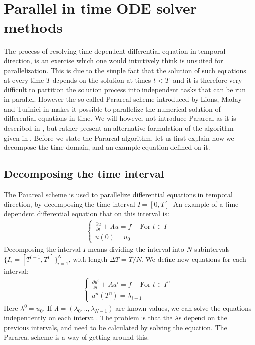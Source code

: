 \chapter{Parallel in time ODE solver methods} \label{parareal_chap}
The process of resolving time dependent differential equation in temporal direction, is an exercise which one would intuitively think is unsuited for parallelization. This is due to the simple fact that the solution of such equations at every time $T$ depends on the solution at times $t<T$, and it is therefore very difficult to partition the solution process into independent tasks that can be run in parallel. However the so called Parareal scheme introduced by Lions, Maday and Turinici in \cite{lions2001resolution} makes it possible to parallelize the numerical solution of differential equations in time. We will however not introduce Parareal as it is described in \cite{lions2001resolution}, but rather present an alternative formulation of the algorithm given in \cite{baffico2002parallel}. Before we state the Parareal algorithm, let us first explain how we decompose the time domain, and an example equation defined on it.
\section{Decomposing the time interval}
The Parareal scheme is used to parallelize differential equations in temporal direction, by decomposing the time interval $I=[0,T]$. An example of a time dependent differential equation that on this interval is:
\begin{align}
\left\{
   	\begin{array}{lr}
		\frac{\partial u}{\partial t} + Au = f \ \quad \textrm{For $t \in I$} \\
		u(0)=u_0
	\end{array}
   \right. \label{unbroken}
\end{align} 
Decomposing the interval $I$ means dividing the interval into $N$ subintervals $\{I_i = [T^{i-1},T^{i}]\}_{i=1}^{N}$, with length $\Delta T = T/N$. We define new equations for each interval:
\begin{align}
\left\{
     \begin{array}{lr}
		\frac{\partial u^i}{\partial t} + Au^i = f \ \quad \textrm{For $t \in I^n$} \\
		u^n(T^n)=\lambda_{i-1}
	\end{array}
	\right.	\label{broken}
\end{align}
Here $\lambda^0=u_0$. If $\Lambda=(\lambda_0,..,\lambda_{N-1})$ are known values, we can solve the equations independently on each interval. The problem is that the $\lambda$s depend on the previous intervals, and need to be calculated by solving the equation. The Parareal scheme is a way of getting around this.
